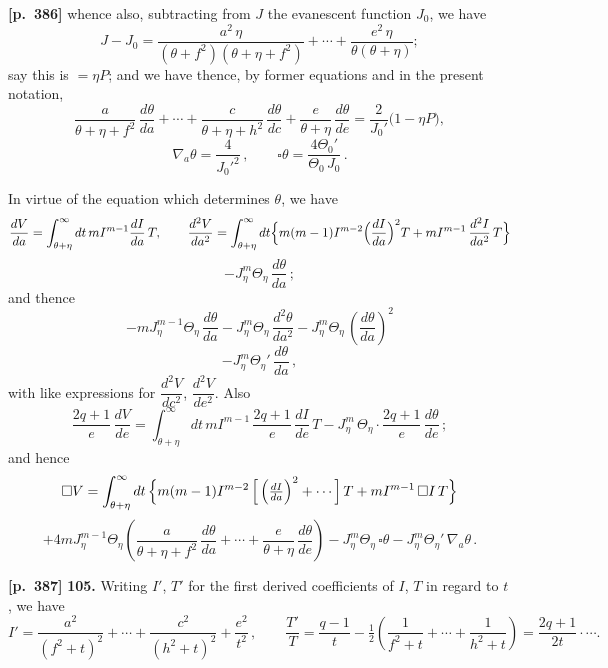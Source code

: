 \documentclass[11pt,a4paper]{article}
\begin{document}
\noindent\textbf{[p.~386]}\quad
whence also, subtracting from $J$ the evanescent function $J_{0}$, we have
\[
J - J_{0} = \frac{a^{2}\,\eta}{(\theta + f^{2})(\theta + \eta + f^{2})} + \cdots + \frac{e^{2}\,\eta}{\theta(\theta + \eta)};
\]
say this is $= \eta P$;
and we have thence, by former equations and in the present notation,
\[
\frac{a}{\theta + \eta + f^{2}}\,\frac{d\theta}{da} + \cdots + \frac{c}{\theta + \eta + h^{2}}\,\frac{d\theta}{dc} + \frac{e}{\theta + \eta}\,\frac{d\theta}{de} = \frac{2}{J_{0}'}\bigl(1 - \eta P\bigr),
\]
\[
\nabla_{a}\theta = \frac{4}{J_{0}'^{2}}\,,\qquad
\square \theta = \frac{4 \Theta_{0}'}{\Theta_{0}\,J_{0}}\,.
\]

In virtue of the equation which determines $\theta$, we have
\[
\frac{dV}{da} = \int_{\theta + \eta}^{\infty} dt\, m I^{m-1}\frac{dI}{da}\,T,\qquad
\frac{d^{2}V}{da^{2}} = \int_{\theta + \eta}^{\infty} dt\Bigl\{ m(m-1) I^{m-2}\Bigl(\frac{dI}{da}\Bigr)^{2}T + m I^{m-1}\,\frac{d^{2}I}{da^{2}}\,T \Bigr\}
\]
\[
- J_{\eta}^{m}\Theta_{\eta}\,\frac{d\theta}{da}\,;
\]
and thence
\[
- m J_{\eta}^{m-1}\Theta_{\eta}\,\frac{d\theta}{da}
- J_{\eta}^{m}\Theta_{\eta}\,\frac{d^{2}\theta}{da^{2}}
- J_{\eta}^{m}\Theta_{\eta}\,\left(\frac{d\theta}{da}\right)^{2}
\]
\[
- J_{\eta}^{m}\Theta_{\eta}'\,\frac{d\theta}{da}\,,
\]
with like expressions for $\dfrac{d^{2}V}{dc^{2}}$, $\dfrac{d^{2}V}{de^{2}}$. Also
\[
\frac{2q+1}{e}\,\frac{dV}{de} = \int_{\theta + \eta}^{\infty} dt\, m I^{m-1}\,\frac{2q+1}{e}\,\frac{dI}{de}\,T - J_{\eta}^{m}\,\Theta_{\eta}\cdot\frac{2q+1}{e}\,\frac{d\theta}{de}\,;
\]
and hence
\[
\square V = \int_{\theta + \eta}^{\infty} dt\,\Bigl\{ m(m-1) I^{m-2}\,\Bigl[\,\Bigl(\tfrac{dI}{da}\Bigr)^{2} + \cdots\,\Bigr]\,T + m I^{m-1}\,\square I\,T \Bigr\}
\]
\[
+ 4 m J_{\eta}^{m-1}\Theta_{\eta}\left( \frac{a}{\theta + \eta + f^{2}}\,\frac{d\theta}{da} + \cdots + \frac{e}{\theta + \eta}\,\frac{d\theta}{de} \right)
- J_{\eta}^{m}\Theta_{\eta}\,\square\theta - J_{\eta}^{m}\Theta_{\eta}'\,\nabla_{a}\theta\,.
\]

\noindent\textbf{[p.~387]}\quad
\textbf{105.} Writing $I'$, $T'$ for the first derived coefficients of $I$, $T$ in regard to $t$, we have
\[
I' = \frac{a^{2}}{(f^{2}+t)^{2}} + \cdots + \frac{c^{2}}{(h^{2}+t)^{2}} + \frac{e^{2}}{t^{2}}\,,\qquad
\frac{T'}{T} = \frac{q-1}{t} - \tfrac{1}{2}\left( \frac{1}{f^{2}+t} + \cdots + \frac{1}{h^{2}+t} \right) = \frac{2q+1}{2t} \cdot \cdots.
\]
\end{document}
